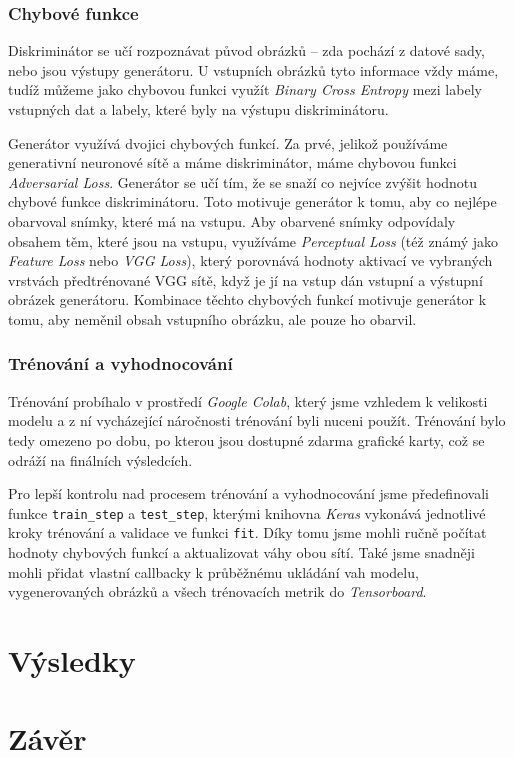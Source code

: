 \documentclass[12pt, a4paper]{article}
\begin{document}
    \subsubsection{Chybové funkce}
    Diskriminátor se učí rozpoznávat původ obrázků -- zda pochází z datové sady, nebo jsou výstupy generátoru. U vstupních obrázků tyto informace vždy máme, tudíž můžeme jako chybovou funkci využít \textit{Binary Cross Entropy} mezi labely vstupných dat a labely, které byly na výstupu diskriminátoru.
    
    Generátor využívá dvojici chybových funkcí. Za prvé, jelikož používáme generativní neuronové sítě a máme diskriminátor, máme chybovou funkci \textit{Adversarial Loss}. Generátor se učí tím, že se snaží co nejvíce zvýšit hodnotu chybové funkce diskriminátoru. Toto motivuje generátor k tomu, aby co nejlépe obarvoval snímky, které má na vstupu.
    Aby obarvené snímky odpovídaly obsahem těm, které jsou na vstupu, využíváme \textit{Perceptual Loss} (též známý jako \textit{Feature Loss} nebo \textit{VGG Loss}), který porovnává hodnoty aktivací ve vybraných vrstvách předtrénované VGG sítě, když je jí na vstup dán vstupní a výstupní obrázek generátoru.
    Kombinace těchto chybových funkcí motivuje generátor k tomu, aby neměnil obsah vstupního obrázku, ale pouze ho obarvil.
    
    \subsubsection{Trénování a vyhodnocování}
    Trénování probíhalo v prostředí \textit{Google Colab}, který jsme vzhledem k velikosti modelu a z ní vycházející náročnosti trénování byli nuceni použít. Trénování bylo tedy omezeno po dobu, po kterou jsou dostupné zdarma grafické karty, což se odráží na finálních výsledcích. 
    
    Pro lepší kontrolu nad procesem trénování a vyhodnocování jsme předefinovali funkce \texttt{train\_step} a \texttt{test\_step}, kterými knihovna \textit{Keras} vykonává jednotlivé kroky trénování a validace ve funkci \texttt{fit}. Díky tomu jsme mohli ručně počítat hodnoty chybových funkcí a aktualizovat váhy obou sítí. Také jsme snadněji mohli přidat vlastní callbacky k průběžnému ukládání vah modelu, vygenerovaných obrázků a všech trénovacích metrik do \textit{Tensorboard}.
    
    \section{Výsledky}
    
    \section{Závěr}
    
    \newpage
    
    
    
\end{document}
